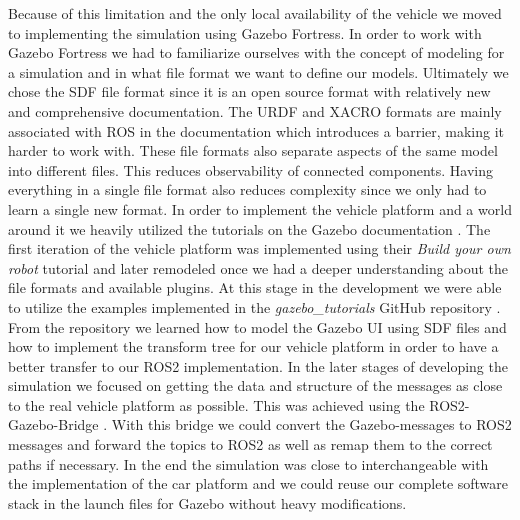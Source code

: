 Because of this limitation and the only local availability of the vehicle we moved to implementing the simulation using Gazebo Fortress. In order to work with Gazebo Fortress we had to familiarize ourselves with the concept of modeling for a simulation and in what file format we want to define our models. Ultimately we chose the SDF file format since it is an open source format with relatively new and comprehensive documentation. The URDF and XACRO formats are mainly associated with ROS in the documentation which introduces a barrier, making it harder to work with. These file formats also separate aspects of the same model into different files. This reduces observability of connected components. Having everything in a single file format also reduces complexity since we only had to learn a single new format. In order to implement the vehicle platform and a world around it we heavily utilized the tutorials on the Gazebo documentation \cite{gazebo-documentation}. The first iteration of the vehicle platform was implemented using their \textit{Build your own robot} tutorial and later remodeled once we had a deeper understanding about the file formats and available plugins. At this stage in the development we were able to utilize the examples implemented in the \textit{gazebo\_tutorials} GitHub repository \cite{gazebo-tutorials}. From the repository we learned how to model the Gazebo UI using SDF files and how to implement the transform tree for our vehicle platform in order to have a better transfer to our ROS2 implementation. In the later stages of developing the simulation we focused on getting the data and structure of the messages as close to the real vehicle platform as possible. This was achieved using the ROS2-Gazebo-Bridge \cite{ros-gz-bridge}. With this bridge we could convert the Gazebo-messages to ROS2 messages and forward the topics to ROS2 as well as remap them to the correct paths if necessary. In the end the simulation was close to interchangeable with the implementation of the car platform and we could reuse our complete software stack in the launch files for Gazebo without heavy modifications.


